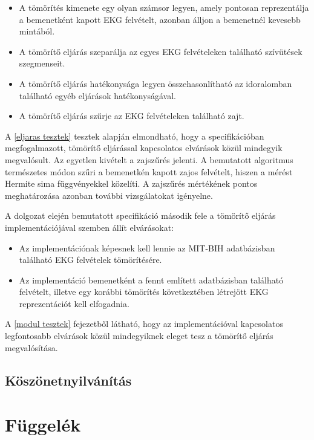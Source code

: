 \documentclass[oneside,titlepage,12pt,a4paper]{report}
\begin{document}
\begin{itemize}
\item A tömörítés kimenete egy olyan számsor legyen, amely pontosan reprezentálja a bemenetként kapott EKG felvételt, azonban álljon a bemenetnél kevesebb mintából.
\item A tömörítő eljárás szeparálja az egyes EKG felvételeken található szívütések szegmenseit. 
\item A tömörítő eljárás hatékonysága legyen összehasonlítható az idoralomban található egyéb eljárások hatékonyságával. 
\item A tömörítő eljárás szűrje az EKG felvételeken található zajt.
\end{itemize}

A \ref{eljaras tesztek} tesztek alapján elmondható, hogy a specifikációban megfogalmazott, tömörítő eljárással kapcsolatos elvárások közül mindegyik megvalósult. Az egyetlen kivételt a zajszűrés jelenti. A bemutatott algoritmus természetes módon szűri a bemenetkén kapott zajos felvételt, hiszen a mérést Hermite sima függvényekkel közelíti. A zajszűrés mértékének pontos meghatározása azonban további vizsgálatokat igényelne. 
\par A dolgozat elején bemutatott specifikáció második fele a tömörítő eljárás implementációjával szemben állít elvárásokat:

\begin{itemize}
\item Az implementációnak képesnek kell lennie az MIT-BIH adatbázisban található EKG felvételek tömörítésére. 
\item Az implementáció bemenetként a fennt említett adatbázisban található felvételt, illetve egy korábbi tömörítés következtében létrejött EKG reprezentációt kell elfogadnia.
\end{itemize} 

A \ref{modul tesztek} fejezetből látható, hogy az implementációval kapcsolatos legfontosabb elvárások közül mindegyiknek eleget tesz a tömörítő eljárás megvalósítása.  

\section{Köszönetnyilvánítás}



\chapter{Függelék}
\end{document}
